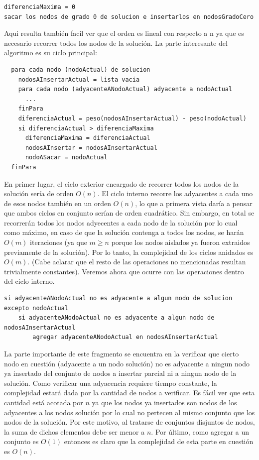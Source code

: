 \documentclass[a4paper,11pt] {article}
\begin{document}
\begin{verbatim}
diferenciaMaxima = 0
sacar los nodos de grado 0 de solucion e insertarlos en nodosGradoCero 
\end{verbatim}

Aqui resulta también facil ver que el orden es lineal con respecto a n ya que es necesario recorrer todos los nodos de la solución. La parte interesante del algoritmo es su ciclo principal:

\begin{verbatim}
  para cada nodo (nodoActual) de solucion
    nodosAInsertarActual = lista vacia
    para cada nodo (adyacenteANodoActual) adyacente a nodoActual
      ...
    finPara
    diferenciaActual = peso(nodosAInsertarActual) - peso(nodoActual)
    si diferenciaActual > diferenciaMaxima
      diferenciaMaxima = diferenciaActual
      nodosAInsertar = nodosAInsertarActual
      nodoASacar = nodoActual
  finPara
\end{verbatim}

En primer lugar, el ciclo exterior encargado de recorrer todos los nodos de la solución sería de orden $O(n)$. El ciclo interno recorre los adyacentes a cada uno de esos nodos también en un orden $O(n)$, lo que a primera vista daría a pensar que ambos ciclos en conjunto serían de orden cuadrático. Sin embargo, en total se recorrerán todos los nodos adyecentes a cada nodo de la solución por lo cual como máximo, en caso de que la solución contenga a todos los nodos, se harán $O(m)$ iteraciones (ya que $m \geq n$ porque los nodos aislados ya fueron extraidos previamente de la solución). Por lo tanto, la complejidad de los ciclos anidados es $O(m)$. (Cabe aclarar que el resto de las operaciones no mencionadas resultan trivialmente constantes). Veremos ahora que ocurre con las operaciones dentro del ciclo interno.

\begin{verbatim}
si adyacenteANodoActual no es adyacente a algun nodo de solucion excepto nodoActual
    si adyacenteANodoActual no es adyacente a algun nodo de nodosAInsertarActual
        agregar adyacenteANodoActual en nodosAInsertarActual
\end{verbatim}

La parte importante de este fragmento se encuentra en la verificar que cierto nodo en cuestión (adyacente a un nodo solución) no es adyacente a ningun nodo ya insertado del conjunto de nodos a insertar parcial ni a ningun nodo de la solución. Como verificar una adyacencia requiere tiempo constante, la complejidad estará dada por la cantidad de nodos a verificar. Es fácil ver que esta cantidad está acotada por $n$ ya que los nodos ya insertados son nodos de los adyacentes a los nodos solución por lo cual no pertecen al mismo conjunto que los nodos de la solución. Por este motivo, al tratarse de conjuntos disjuntos de nodos, la suma de dichos elementos debe ser menor a $n$. Por último, como agregar a un conjunto es $O(1)$ entonces es claro que la complejidad de esta parte en cuestión es $O(n)$.
\end{document}
